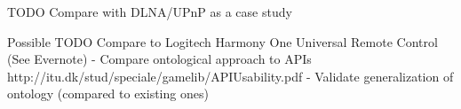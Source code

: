 









TODO Compare with DLNA/UPnP as a case study

Possible TODO
Compare to Logitech Harmony One Universal Remote Control (See Evernote)
- Compare ontological approach to APIs http://itu.dk/stud/speciale/gamelib/APIUsability.pdf
- Validate generalization of ontology (compared to existing ones)